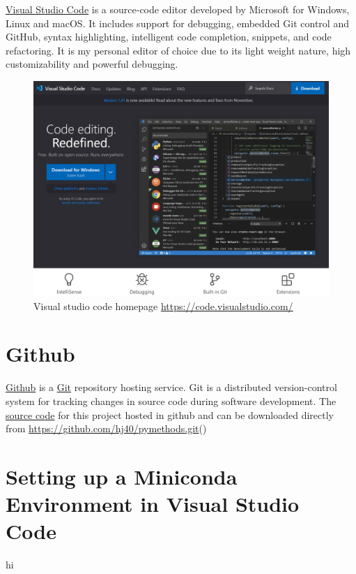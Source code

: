 \documentclass[10pt,a4paper]{article}
\begin{document}
		\href{https://code.visualstudio.com/}{Visual Studio Code} is a source-code editor developed by Microsoft for Windows, Linux and macOS. It includes support for debugging, embedded Git control and GitHub, syntax highlighting, intelligent code completion, snippets, and code refactoring. It is my personal editor of choice due to its light weight nature, high customizability and powerful debugging.
		\begin{figure}[h]
			\centering
			\includegraphics[scale=0.25]{figures/vsc_page.PNG}
			\caption{Visual studio code homepage \url{https://code.visualstudio.com/}}
		\end{figure}
	\section{Github}
		\href{https://github.com/}{Github} is a \href{https://git-scm.com/}{Git} repository hosting service. Git is a distributed version-control system for tracking changes in source code during software development. The \href{https://github.com/hj40/pymethods}{source code} for this project hosted in github and can be downloaded directly from \url{https://github.com/hj40/pymethods.git}()
	\section{Setting up a Miniconda Environment in Visual Studio Code}
		hi
		
		
\end{document}
